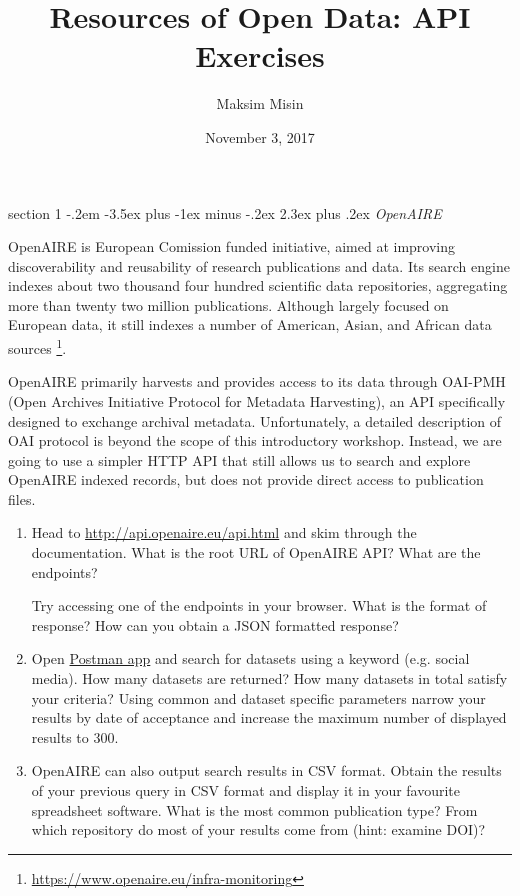 \documentclass[12pt]{article}
\makeatletter
\newenvironment{problem}{\@startsection
	{section}
	{1}
	{-.2em}
	{-3.5ex plus -1ex minus -.2ex}
	{2.3ex plus .2ex}
	{\pagebreak[3]%
		\large\bf\noindent{Exercise }
	}
}
{\vspace{0.8cm}}
\makeatother
\begin{document}
	
	\title{Resources of Open Data: API Exercises}
	\author{Maksim Misin}
	\date{November 3, 2017}
	
	\maketitle
	
	\thispagestyle{empty}
	
	\begin{problem}{\it OpenAIRE}

	OpenAIRE is European Comission funded initiative, aimed at improving discoverability and reusability of research publications and data. Its search engine indexes about two thousand four hundred scientific data repositories, aggregating more than twenty two million publications. Although largely focused on European data, it still indexes a number of American, Asian, and African data sources \footnote{\url{https://www.openaire.eu/infra-monitoring}}.
	
	OpenAIRE primarily harvests and provides access to its data through OAI-PMH (Open Archives Initiative Protocol for Metadata Harvesting), an API specifically designed to exchange archival metadata. Unfortunately, a detailed description of OAI protocol is beyond the scope of this introductory workshop. Instead, we are going to use a simpler HTTP API that still allows us to search and explore OpenAIRE indexed records, but does not provide direct access to publication files.
	
	\begin{enumerate}[label=\textbf{\alph*)},leftmargin=*]
		\item Head to \url{http://api.openaire.eu/api.html} and skim through the documentation. What is the root URL of OpenAIRE API? What are the endpoints? 
		
		Try accessing one of the endpoints in your browser. What is the format of response? How can you obtain a JSON formatted response?
		
		\item Open \href{https://chrome.google.com/webstore/detail/postman/fhbjgbiflinjbdggehcddcbncdddomop}{Postman app} and search for datasets using a keyword (e.g. social media). How many datasets are returned? How many datasets in total satisfy your criteria? Using common and dataset specific parameters narrow your results by date of acceptance and increase the maximum number of displayed results to 300.
		
		\item OpenAIRE can also output search results in CSV format. Obtain the results of your previous query in CSV format and display it in your favourite spreadsheet software. What is the most common publication type? From which repository do most of your results come from (hint: examine DOI)?
		
	\end{enumerate}
		
	\end{problem}
	
\end{document}
